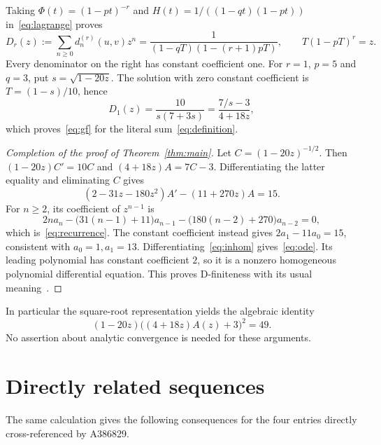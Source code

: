 \documentclass[11pt]{article}
\begin{document}
Taking $\Phi(t)=(1-pt)^{-r}$ and
$H(t)=1/((1-qt)(1-pt))$ in~\eqref{eq:lagrange} proves
\begin{equation}\label{eq:general-gf}
 D_r(z):=\sum_{n\geq0}d^{(r)}_n(u,v)z^n
 =\frac{1}{(1-qT)(1-(r+1)pT)},\qquad
 T(1-pT)^r=z.
\end{equation}
Every denominator on the right has constant coefficient one.
For $r=1$, $p=5$ and $q=3$, put $s=\sqrt{1-20z}$.
The solution with zero constant coefficient is $T=(1-s)/10$, hence
\[
 D_1(z)=\frac{10}{s(7+3s)}
        =\frac{7/s-3}{4+18z},
\]
which proves~\eqref{eq:gf} for the literal sum~\eqref{eq:definition}.

\begin{proof}[Completion of the proof of Theorem~\ref{thm:main}]
Let $C=(1-20z)^{-1/2}$. Then $(1-20z)C'=10C$ and
$(4+18z)A=7C-3$. Differentiating the latter equality and eliminating
$C$ gives
\begin{equation}\label{eq:inhom}
 (2-31z-180z^2)A'-(11+270z)A=15.
\end{equation}
For $n\geq2$, its coefficient of $z^{n-1}$ is
\[
 2na_n-\bigl(31(n-1)+11\bigr)a_{n-1}
        -\bigl(180(n-2)+270\bigr)a_{n-2}=0,
\]
which is~\eqref{eq:recurrence}. The constant coefficient instead gives
$2a_1-11a_0=15$, consistent with $a_0=1,a_1=13$.
Differentiating~\eqref{eq:inhom} gives~\eqref{eq:ode}.
Its leading polynomial has constant coefficient $2$, so it is a nonzero
homogeneous polynomial differential equation. This proves D-finiteness
with its usual meaning~\cite[\S1]{stanley}.
\end{proof}

In particular the square-root representation yields the algebraic identity
\begin{equation}\label{eq:algebraic}
 (1-20z)\bigl((4+18z)A(z)+3\bigr)^2=49.
\end{equation}
No assertion about analytic convergence is needed for these arguments.

\section{Directly related sequences}
The same calculation gives the following consequences for the four
entries directly cross-referenced by A386829.
\end{document}
